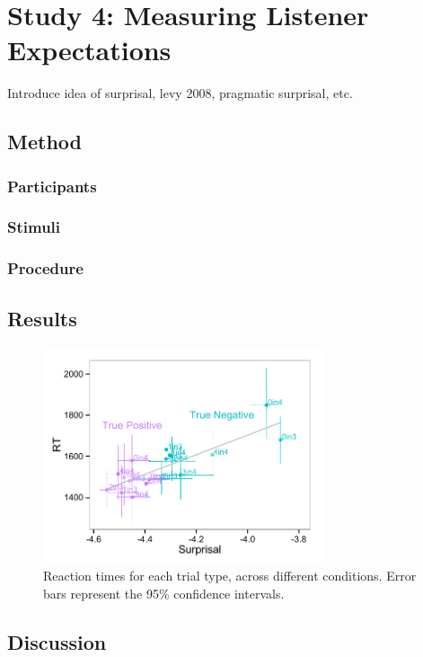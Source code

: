 \documentclass[10pt,letterpaper]{article}
\begin{document}
\section{Study 4: Measuring Listener Expectations}
Introduce idea of surprisal, levy 2008, pragmatic surprisal, etc. 

\subsection{Method}

\subsubsection{Participants}

\subsubsection{Stimuli}

\subsubsection{Procedure}

\subsection{Results}
\begin{figure}
\begin{center} 
\includegraphics[width=3.25in]{figures/speakerstudy_comparison.pdf}
\caption{\label{fig:addition_subs} Reaction times for each trial type, across different conditions.  Error bars represent the 95\% confidence intervals.}
\end{center} 
\end{figure}

\subsection{Discussion}
\end{document}
